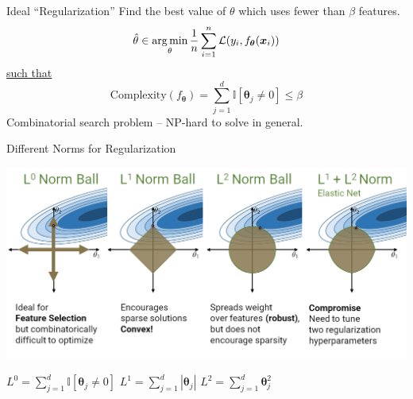 \documentclass[aspectratio=169]{../latex_main/tntbeamer}  %
\begin{document}
	
	\begin{frame}[c]{Ideal “Regularization”}
	Find the best value of $\theta$ which uses fewer than $\beta$ features.
	  \begin{equation*}
	        \hat{\theta} \in \operatorname*{arg\,min}_{\theta} \frac{1}{n}\sum\limits_{i=1}^n\mathcal{L}(y_i,f_{\bm{\theta}}(\bm{x}_i))
	    \end{equation*}
	    \underline{such that}
	    \begin{equation*}
                \text{Complexity}(f_{\bm{\theta}}) = \sum\limits_{j=1}^d\mathbb{I}[\bm{\theta}_j \neq 0]  \leq \beta
        \end{equation*}
        Combinatorial search problem – NP-hard to solve in general.

	\end{frame}
	
	\begin{frame}{Different Norms for Regularization}
	
	\begin{center}
	       \includegraphics[scale=.3]{Bild17}
	       
	       $L^0 = \sum_{j=1}^d\mathbb{I}[\bm{\theta}_j \neq 0]$\hspace{1em} $L^1 = \sum_{j=1}^d|\bm{\theta}_j|$\hspace{1em} $L^2 = \sum_{j=1}^d\bm{\theta}_j^2$
	\end{center}
	    
	\end{frame}
	
\end{document}
